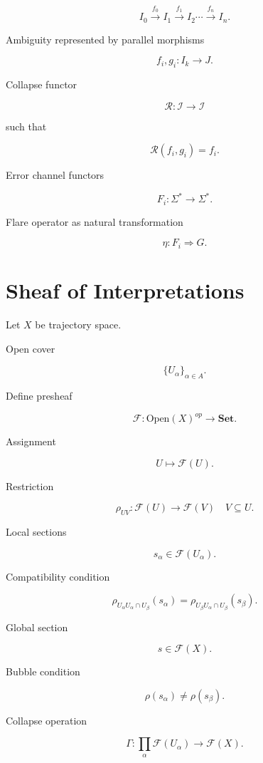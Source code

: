 \documentclass[11pt]{article}
\begin{document}
\[
I_0
\xrightarrow{f_0}
I_1
\xrightarrow{f_1}
I_2
\cdots
\xrightarrow{f_n}
I_n.
\]

Ambiguity represented by parallel morphisms

\[
f_i,g_i : I_k \to J.
\]

Collapse functor

\[
\mathcal{R} :
\mathcal{I} \to \mathcal{I}
\]

such that

\[
\mathcal{R}(f_i,g_i) = f_i.
\]

Error channel functors

\[
F_i : \Sigma^* \to \Sigma^*.
\]

Flare operator as natural transformation

\[
\eta : F_i \Rightarrow G.
\]


\section{Sheaf of Interpretations}

Let $X$ be trajectory space.

Open cover

\[
\{U_\alpha\}_{\alpha\in A}.
\]

Define presheaf

\[
\mathcal{F} :
\text{Open}(X)^{op}
\to \mathbf{Set}.
\]

Assignment

\[
U \mapsto \mathcal{F}(U).
\]

Restriction

\[
\rho_{UV} :
\mathcal{F}(U) \to \mathcal{F}(V)
\quad V \subseteq U.
\]

Local sections

\[
s_\alpha \in \mathcal{F}(U_\alpha).
\]

Compatibility condition

\[
\rho_{U_\alpha U_\alpha \cap U_\beta}(s_\alpha)
=
\rho_{U_\beta U_\alpha \cap U_\beta}(s_\beta).
\]

Global section

\[
s \in \mathcal{F}(X).
\]

Bubble condition

\[
\rho(s_\alpha) \neq \rho(s_\beta).
\]

Collapse operation

\[
\Gamma :
\prod_\alpha \mathcal{F}(U_\alpha)
\to \mathcal{F}(X).
\]
\end{document}
